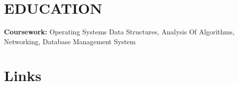 \documentclass[]{deedy-resume-openfont}
\begin{document}
\hfill
\begin{minipage}[t]{1.0\textwidth} 






\section{EDUCATION}
\vspace{0.2em}
\textbf{Coursework:}
\textbullet{} Operating Systems
\textbullet{} Data Structures, 
\textbullet{} Analysis Of Algorithms, 
\textbullet{} Networking, 
\textbullet{} Database Management System 

\sectionsep



\section{Links} 


\end{minipage}
\end{document}
